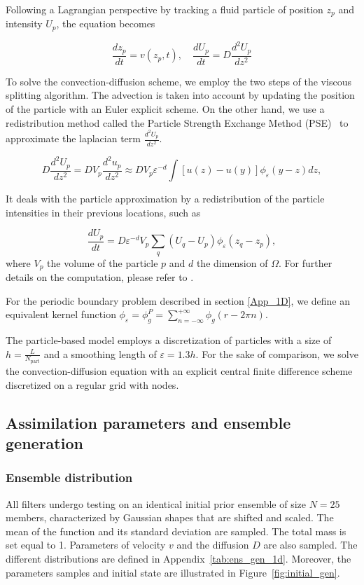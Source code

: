 Following a Lagrangian perspective by tracking a fluid particle of position $z_p$ and intensity $U_p$, the equation becomes

\begin{equation*}
	\frac{dz_p}{dt} = v(z_p, t), \quad \frac{dU_p}{dt} = D \frac{d^2 U_p}{dz^2}
\end{equation*}

To solve the convection-diffusion scheme, we employ the two steps of the viscous splitting algorithm. The advection is taken into account by updating the position of the particle with an Euler explicit scheme.
On the other hand, we use a redistribution method called the Particle Strength Exchange Method (PSE)~\cite{degond_1989,cottet_1990} to approximate the laplacian term $\frac{d^2 U_p}{dz^2}$.


\begin{equation*}
	D \frac{d^2 U_p}{dz^2}  = D V_p \frac{d^2 u_p}{dz^2} \approx D V_p \varepsilon^{-d} \int [u(z)  - u(y)] \phi_\varepsilon(y - z) dz,
\end{equation*}

It deals with the particle approximation by a redistribution of the particle intensities in their previous locations, such as

\begin{equation*}
	\frac{dU_p}{dt} = D \varepsilon^{-d} V_p \sum_q (U_q - U_p) \phi_\varepsilon( z_q -  z_p),
\end{equation*}where $V_p$ the volume of the particle $p$ and $d$ the dimension of $\Omega$.
For further details on the computation, please refer to \cite{cottet_1990}.

For the periodic boundary problem described in section \ref{App_1D}, we define an equivalent kernel function $\phi_\varepsilon= \phi^P_g = \sum_{n=-\infty}^{+\infty} \phi_g(r - 2 \pi  n )$.

The particle-based model employs a discretization of \npart{} particles with a size of $h = \frac{L}{N_{\text{part}}}$ and a smoothing length of $\varepsilon = 1.3 h$.
For the sake of comparison, we solve the convection-diffusion equation with an explicit central finite difference scheme discretized on a regular grid with \ngrid{} nodes.

\subsection{Assimilation parameters and ensemble generation}

\subsubsection{Ensemble distribution}
All filters undergo testing on an identical initial prior ensemble of size $N = 25$ members, characterized by Gaussian shapes that are shifted and scaled. The mean of the function and its standard deviation are sampled. The total mass is set equal to 1. Parameters of velocity $v$ and the diffusion $D$ are also sampled. The different distributions are defined in Appendix~\ref{tab:ens_gen_1d}. Moreover, the parameters samples and initial state are illustrated in Figure~\ref{fig:initial_gen}.

